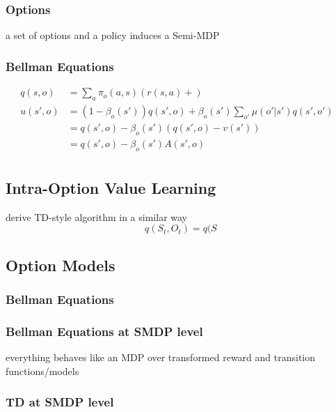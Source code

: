 \documentclass[]{article}
\theoremstyle{definition}
\begin{document}
\subsubsection{Options}
\label{ssub:options}
a set of options and a policy induces a Semi-MDP

\subsubsection{Bellman Equations}
\label{ssub:options_bellman_equations}

\begin{align*}
    q(s,o) &= \sum_a \pi_o (a,s) (r(s,a) + )   \\
    u(s',o) & = (1 - \beta_o(s')) q(s', o) + \beta_o(s') \sum_{o'} \mu (o'|s')q(s',o') &\\
    &= q(s',o) - \beta_o(s')(q(s',o) - v(s')) \\
    &= q(s',o) - \beta_o(s')A(s',o) \\
\end{align*}

\subsection{Intra-Option Value Learning}
\label{sub:intra_option_value_learning}

derive TD-style algorithm in a similar way
\begin{equation}
    q(S_t, O_t) = q(S
\end{equation}

\subsection{Option Models}
\label{sub:option_models}

\subsubsection{Bellman Equations}
\label{ssub:option_model_bellman_equations}

\subsubsection{Bellman Equations at SMDP level}
\label{ssub:bellman_equations_at_smdp_level}
everything behaves like an MDP over transformed reward and transition functions/models


\subsubsection{TD at SMDP level}
\label{ssub:td_at_smdp_level}
\end{document}
